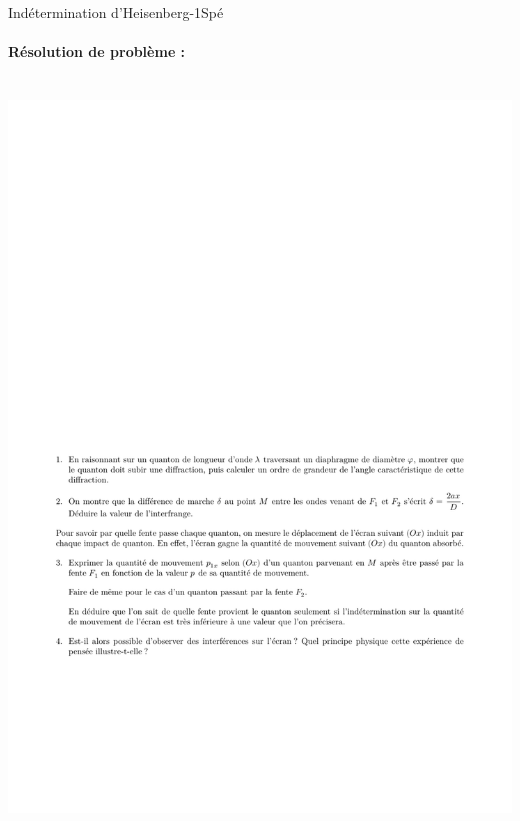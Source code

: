 \begin{exercise}{Indétermination d'Heisenberg}{-1}{Spé}
\paragraph{Résolution de problème :}~\\
\includegraphics[width=\linewidth]{oraux/centrale/heisenberg2.pdf}

\end{exercise}
